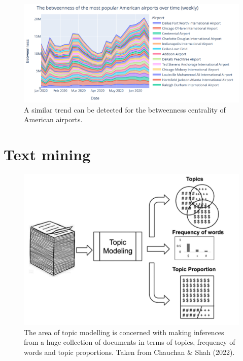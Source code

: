 \documentclass[10pt, a4paper, twocolumn]{article} %
\begin{document}
\begin{figure}[h]
  \includegraphics[width=\linewidth]{../visualizations/betweenness_screenshot.png}
  \caption{A similar trend can be detected for the betweenness centrality of American airports.}
  \label{fig:betweenness}
\end{figure}


\section{Text mining}

\begin{figure}[h]
  \includegraphics[width=\linewidth]{../visualizations/topic_modelling.png}
  \caption{The area of topic modelling is concerned with making inferences from a huge collection of documents in terms of topics, frequency of words and topic proportions. Taken from Chauchan \& Shah (2022).}
  \label{fig:topic_modelling}
\end{figure}
\end{document}
